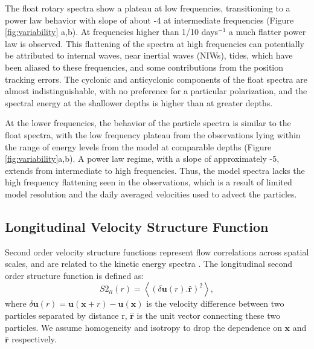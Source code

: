 \documentclass[]{ametsoc}
\begin{document}
The float rotary spectra show a plateau at low frequencies, transitioning to a power law behavior with slope of about -4 at intermediate frequencies (Figure \ref{fig:variability} a,b). At frequencies higher than 1/10 days$^{-1}$ a much flatter power law is observed. This flattening of the spectra at high frequencies can potentially be attributed to internal waves, near inertial waves (NIWs), tides, which have been aliased to these frequencies, and some contributions from the position tracking errors. The cyclonic and anticyclonic components of the float spectra are almost indistinguishable, with no preference for a particular polarization, and the spectral energy at the shallower depths is  higher than at greater depths. 

At the lower frequencies, the behavior of the particle spectra is similar to the float spectra, with the low frequency plateau from the observations lying within the range of energy levels from the model at comparable depths 
(Figure \ref{fig:variability}a,b). A power law regime, with a slope of approximately -5, extends from intermediate to high frequencies.
Thus, the model spectra lacks the high frequency flattening seen in the observations, which is a result of limited model resolution and the daily averaged velocities used to advect the particles.  


\subsection{Longitudinal Velocity Structure Function}
Second order velocity structure functions represent flow correlations across spatial scales, and are related to the kinetic energy spectra \citep{babiano1985structure, lacasce2016estimating}. The longitudinal second order structure function is defined as:
\begin{equation}
    S2_{ll}(r) = \left< (\delta \mathbf{u}(r). \mathbf{\hat{r}})^2\right>,
\end{equation}
where $\delta \mathbf{u} (r) = \mathbf{u}(\mathbf{x} + r) - \mathbf{u}(\mathbf{x})$ is the velocity difference between two particles separated by distance r, $\mathbf{\hat{r}}$ is the unit vector connecting these two particles. 
We assume homogeneity and isotropy to drop the dependence on $\mathbf{x}$ and $\mathbf{\hat{r}}$ respectively. 
\end{document}
